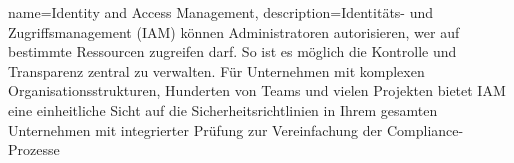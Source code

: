 


{
    name=Identity and Access Management,
    description={Identitäts- und Zugriffsmanagement (IAM) können Administratoren autorisieren, wer auf bestimmte Ressourcen zugreifen darf. So ist es möglich die Kontrolle und Transparenz zentral zu verwalten. Für Unternehmen mit komplexen Organisationsstrukturen, Hunderten von Teams und vielen Projekten bietet IAM eine einheitliche Sicht auf die Sicherheitsrichtlinien in Ihrem gesamten Unternehmen mit integrierter Prüfung zur Vereinfachung der Compliance-Prozesse}
}